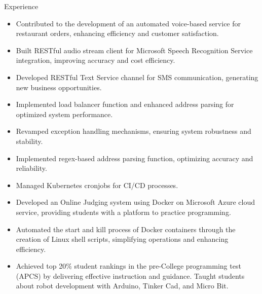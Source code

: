 \documentclass{resume} %
\begin{document}
\begin{workSection}{Experience}
    \experienceItem[
        company=Novo Labs Inc,
        location=Dallas{,} TX,
        position=Software Engineer,
        duration=Feb 2021 – Jun 2023
    ]
     \begin{itemize}
        \itemsep -6pt {} 
        \item Contributed to the development of an automated voice-based service for restaurant orders, enhancing efficiency and customer satisfaction.
        \item Built RESTful audio stream client for Microsoft Speech Recognition Service integration, improving accuracy and cost efficiency.
        \item Developed RESTful Text Service channel for SMS communication, generating new business opportunities.
        \item Implemented load balancer function and enhanced address parsing for optimized system performance.
        \item Revamped exception handling mechanisms, ensuring system robustness and stability.
        \item Implemented regex-based address parsing function, optimizing accuracy and reliability.
        \item Managed Kubernetes cronjobs for CI/CD processes.
     \end{itemize}
     
    \experienceItem[
        company=CodePro Education \& Universities,
        location=Taichung{,} Taiwan,
        position=Software Engineer \& CS Lecturer,
        duration=Dec 2019 – Dec 2020
    ]
    \begin{itemize}
        \itemsep -6pt {} 
        \item Developed an Online Judging system using Docker on Microsoft Azure cloud service, providing students with a platform to practice programming.
        \item Automated the start and kill process of Docker containers through the creation of Linux shell scripts, simplifying operations and enhancing efficiency.
        \item Achieved top 20\% student rankings in the pre-College programming test (APCS) by delivering effective instruction and guidance. Taught students about robot development with Arduino, Tinker Cad, and Micro Bit.
     \end{itemize}


\end{workSection}
\end{document}
